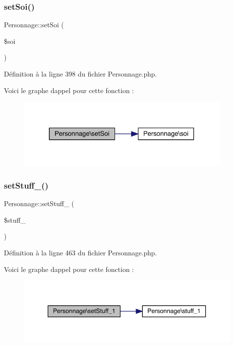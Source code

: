 \subsubsection{\texorpdfstring{set\+Soi()}{setSoi()}}
{\footnotesize\ttfamily Personnage\+::set\+Soi (\begin{DoxyParamCaption}\item[{}]{\$soi }\end{DoxyParamCaption})}



Définition à la ligne 398 du fichier Personnage.\+php.

Voici le graphe d\textquotesingle{}appel pour cette fonction \+:\nopagebreak
\begin{figure}[H]
\begin{center}
\leavevmode
\includegraphics[width=302pt]{class_personnage_a9e07b4d56c5b54669cb6184b4b4a46c1_cgraph}
\end{center}
\end{figure}
\mbox{\label{class_personnage_a65802b0a0d09e0d4027861542464b966}} 
\subsubsection{\texorpdfstring{set\+Stuff\+\_()}{setStuff\_1()}}
{\footnotesize\ttfamily Personnage\+::set\+Stuff\+\_ (\begin{DoxyParamCaption}\item[{}]{\$stuff\+\_ }\end{DoxyParamCaption})}



Définition à la ligne 463 du fichier Personnage.\+php.

Voici le graphe d\textquotesingle{}appel pour cette fonction \+:\nopagebreak
\begin{figure}[H]
\begin{center}
\leavevmode
\includegraphics[width=336pt]{class_personnage_a65802b0a0d09e0d4027861542464b966_cgraph}
\end{center}
\end{figure}
\mbox{\label{class_personnage_abbfd017defe625b98830231b7bfa8f94}} 
